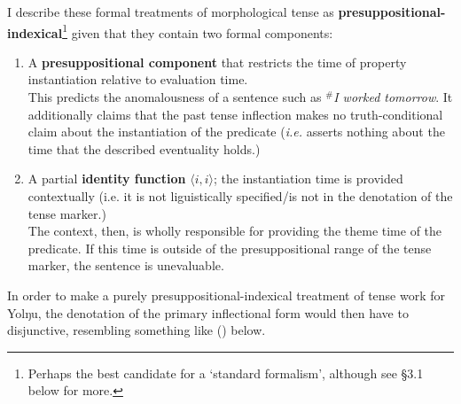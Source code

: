 \documentclass[12pt]{article}
\newcommand{\la}{\langle}
\newcommand{\ra}{\rangle}
\begin{document}
I describe these formal treatments of morphological tense as \textbf{presuppositional-indexical}\footnote{Perhaps the best candidate for a `standard formalism', although see §3.1 below for more.} given that they contain two formal components:
\begin{enumerate}[label=\roman*)]
	\item A \textbf{presuppositional component} that restricts the time of property instantiation relative to evaluation time.\\This predicts the anomalousness of a sentence such as \textit{$^\#$I worked tomorrow}. It additionally claims that the past tense inflection makes no truth-conditional claim about the instantiation of the predicate (\textit{i.e.} asserts nothing about the time that the described eventuality holds.)
	\item A partial \textbf{identity function} $\la i,i\ra$; the instantiation time is provided contextually (i.e. it is not liguistically specified/is not in the denotation of the tense marker.)\\The context, then, is wholly responsible for providing the theme time of the predicate. If this time is outside of the presuppositional range of the tense marker, the sentence is unevaluable.
\end{enumerate}

In order to make a purely presuppositional-indexical treatment of tense work for Yolŋu, the denotation of the primary inflectional form would then have to disjunctive, resembling something like (\nextx) below.
\end{document}
